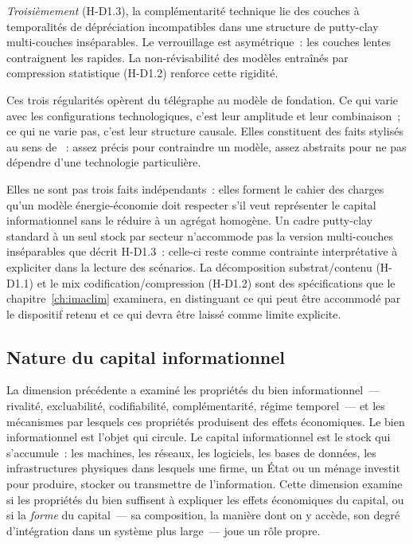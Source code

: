 \emph{Troisièmement} (H-D1.3), la complémentarité technique lie des couches à temporalités de dépréciation incompatibles dans une structure de putty-clay multi-couches inséparables. Le verrouillage est asymétrique~: les couches lentes contraignent les rapides. La non-révisabilité des modèles entraînés par compression statistique (H-D1.2) renforce cette rigidité.

Ces trois régularités opèrent du télégraphe au modèle de fondation. Ce qui varie avec les configurations technologiques, c'est leur amplitude et leur combinaison~; ce qui ne varie pas, c'est leur structure causale. Elles constituent des faits stylisés au sens de \textcite{kaldor_capital_1961}~: assez précis pour contraindre un modèle, assez abstraits pour ne pas dépendre d'une technologie particulière.

Elles ne sont pas trois faits indépendants~: elles forment le cahier des charges qu'un modèle énergie-économie doit respecter s'il veut représenter le capital informationnel sans le réduire à un agrégat homogène. Un cadre putty-clay standard à un seul stock par secteur n'accommode pas la version multi-couches inséparables que décrit H-D1.3~: celle-ci reste comme contrainte interprétative à expliciter dans la lecture des scénarios. La décomposition substrat/contenu (H-D1.1) et le mix codification/compression (H-D1.2) sont des spécifications que le chapitre~\ref{ch:imaclim} examinera, en distinguant ce qui peut être accommodé par le dispositif retenu et ce qui devra être laissé comme limite explicite.


\clearpage
\subsection{Nature du capital informationnel}\label{sec:d2-capital}

La dimension précédente a examiné les propriétés du bien informationnel~--- rivalité, excluabilité, codifiabilité, complémentarité, régime temporel~--- et les mécanismes par lesquels ces propriétés produisent des effets économiques. Le bien informationnel est l'objet qui circule. Le capital informationnel est le stock qui s'accumule~: les machines, les réseaux, les logiciels, les bases de données, les infrastructures physiques dans lesquels une firme, un État ou un ménage investit pour produire, stocker ou transmettre de l'information. Cette dimension examine si les propriétés du bien suffisent à expliquer les effets économiques du capital, ou si la \emph{forme} du capital~--- sa composition, la manière dont on y accède, son degré d'intégration dans un système plus large~--- joue un rôle propre.

